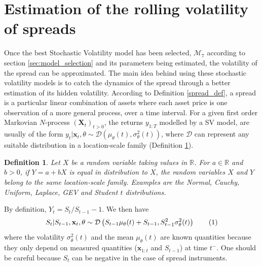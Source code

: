 \documentclass[11pt,a4,twosided,singlespacing,titlepagenumber=on]{scrreprt}
\numberwithin{equation}{chapter} %
\newtheorem{definition}[theorem]{Definition}%
\theoremstyle{remark}
\newcommand{\matr}[1]{\mathbf{#1}}
\newcommand\numberthis{\addtocounter{equation}{1}\tag{\theequation}}
\begin{document}
\section{Estimation of the rolling volatility of spreads}
\label{sec:estimation_bollinger_bands_sv}
Once the best Stochastic Volatility model has been selected, $\mathcal{M}_7$ according to section \ref{sec:model_selection} and its parameters being estimated, the volatility of the spread can be approximated. The main idea behind using these stochastic volatility models is to catch the dynamics of the spread through a better estimation of its hidden volatility. According to Definition \ref{spread_def}, a spread is a particular linear combination of assets where each asset price is one observation of a more general process, over a time interval. For a given first order Markovian $N$-process $(\matr{X}_t)_{t>0}$, the returns $y_{1:T}$ modelled by a SV model, are usually of the form $y_t | \matr{x}_t, \theta \sim \mathcal{D} \left( \mu_\theta(t), \sigma_\theta^2(t) \right)$, where $\mathcal{D}$ can represent any suitable distribution in a location-scale family (Definition \ref{location_scale_family}).

\begin{definition}
\label{location_scale_family}
Let $X$ be a random variable taking values in $\mathbb{R}$. For $a \in \mathbb{R}$ and $b > 0$, if $Y = a + b X$ is equal in distribution to $X$, the random variables $X$ and $Y$ belong to the same location-scale family. Examples are the Normal, Cauchy, Uniform, Laplace, GEV and Student $t$ distributions.
\end{definition}

By definition, $Y_t = S_t / S_{t-1} - 1$. We then have
\begin{equation}
S_t | S_{t-1}, \matr{x}_t, \theta \sim \mathcal{D} \left(S_{t-1} \mu_\theta(t)+S_{t-1}, S_{t-1}^2 \sigma_\theta^2(t) \right) \numberthis \label{equation_price_vol}
\end{equation}
where the volatility $\sigma_\theta^2(t)$ and the mean $\mu_\theta(t)$ are known quantities because they only depend on measured quantities ($\matr{x}_{1:t}$ and $S_{t-1}$) at time $t^-$. One should be careful because $S_t$ can be negative in the case of spread instruments.
\end{document}
